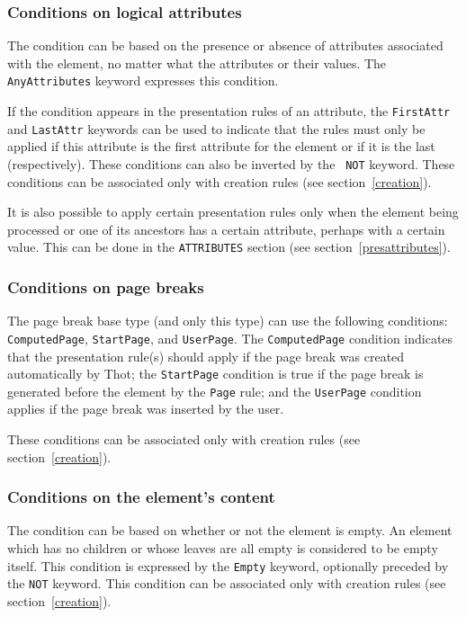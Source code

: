 \subsubsection{Conditions on logical attributes}

The condition can be based on the presence or absence
of attributes associated with the element, no matter what
the attributes or their values.  The {\tt AnyAttributes} keyword
expresses this condition.

If the condition appears in the presentation rules of an attribute, the
{\tt FirstAttr} and {\tt LastAttr} keywords can be used to indicate
that the rules must only be applied if this attribute is the first
attribute for the element or if it is the last
(respectively).  These conditions can also be inverted by the {\tt
NOT} keyword.
These conditions can be associated only with creation rules
(see section~\ref{creation}).

It is also possible to apply certain presentation rules only
when the element being processed or one of its ancestors has a certain
attribute, perhaps with a certain value.  This can be done in the
{\tt ATTRIBUTES} section (see section~\ref{presattributes}).

\subsubsection{Conditions on page breaks}

The page break base type (and only this type) can use the following
conditions:\\
{\tt ComputedPage}, {\tt StartPage}, and {\tt UserPage}.  The
{\tt ComputedPage} condition indicates that
the presentation rule(s) should apply if the page break was created
automatically by Thot;  the {\tt StartPage} condition is true if the
page break is generated before the element by the {\tt Page} rule;
and the {\tt UserPage} condition applies if the page break
was inserted by the user.

These conditions can be associated only with creation rules
(see section~\ref{creation}).

\subsubsection{Conditions on the element's content}

The condition can be based on whether or not the element is empty.  An
element which has no children or whose leaves are all empty is
considered to be empty itself.  This condition is expressed by the
{\tt Empty} keyword, optionally preceded by the {\tt NOT} keyword.
This condition can be associated only with creation rules
(see section~\ref{creation}).

